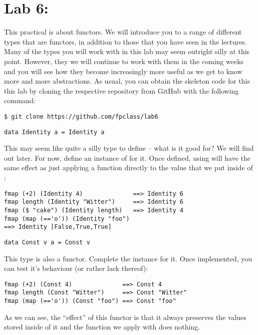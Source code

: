 \section{Lab 6: \practicalSixTitle}

This practical is about functors. We will introduce you to a range of different types that are functors, in addition to those that you have seen in the lectures. Many of the types you will work with in this lab may seem outright silly at this point. However, they we will continue to work with them in the coming weeks and you will see how they become increasingly more useful as we get to know more and more abstractions. As usual, you can obtain the skeleton code for this this lab by cloning the respective repository from GitHub with the following command:
\begin{verbatim}
$ git clone https://github.com/fpclass/lab6
\end{verbatim}

\taskLine

\begin{verbatim}
data Identity a = Identity a
\end{verbatim}
This may seem like quite a silly type to define -- what is it good for? We will find out later. For now, define an instance of  for it. Once defined, using  will have the same effect as just applying a function directly to the value that we put inside of :
\begin{verbatim}
fmap (+2) (Identity 4)              ==> Identity 6
fmap length (Identity "Witter")     ==> Identity 6
fmap ($ "cake") (Identity length)   ==> Identity 4
fmap (map (=='o')) (Identity "foo") 
==> Identity [False,True,True]
\end{verbatim} 


\taskLine 

\begin{verbatim}
data Const v a = Const v
\end{verbatim}
This type is also a functor. Complete the  instance for it. Once implemented, you can test it's behaviour (or rather lack thereof):
\begin{verbatim}
fmap (+2) (Const 4)              ==> Const 4
fmap length (Const "Witter")     ==> Const "Witter"
fmap (map (=='o')) (Const "foo") ==> Const "foo"
\end{verbatim} 
As we can see, the ``effect'' of this functor is that it always preserves the values stored inside of it and the function we apply with  does nothing. 

